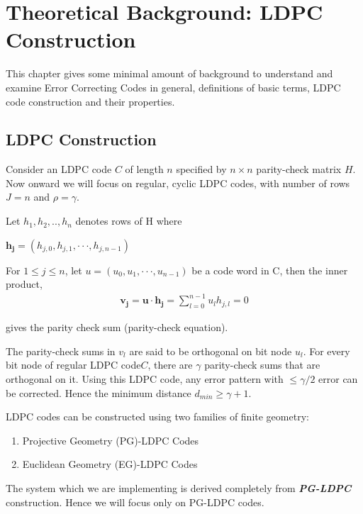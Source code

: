 \chapter{Theoretical Background: LDPC Construction} \label{ldpc_chap}
\label{chapter6}
This chapter gives some minimal amount of background to understand and examine Error Correcting Codes in general, 
definitions of basic terms, LDPC code construction and their properties\cite{shaishav_mtp}.


\section{LDPC Construction} 

Consider an LDPC code \cite{ecc_shu_lin} $C$ of length $n$ specified by $n\times n$ parity-check matrix $H$.
Now onward we will focus on regular, cyclic LDPC codes, with number of rows $J=n$
and $\rho=\gamma$.

Let $h_{1}, h_{2},.., h_{n}$ denotes rows of H where
\begin{center}
 $\mathbf{h_{j}}=(h_{j,0},h_{j,1},\cdot \cdot \cdot,h_{j,n-1} ) $
\end{center}

For $1\leq j \leq n$, let $u= (u_{0}, u_{1},\cdot \cdot \cdot,u_{n-1})$ be a code word in C,
then the inner product,
\begin{align*}
  \mathbf{v_{j}=u \cdot h_{j}}=\sum_{l=0}^{n-1}u_{l} h_{j,l}=0 
\end{align*}


gives the parity check sum (parity-check equation).

The parity-check sums in $v_{l}$ are said to be orthogonal on bit node $u_{l}$.
For every bit node of regular LDPC code$C$, there are $\gamma$ parity-check sums
that are orthogonal on it. Using this LDPC code, any error pattern with $\leq \gamma /2$
error can be corrected.
Hence the minimum distance $d_{min} \geq \gamma +1$.

LDPC codes can be constructed using two families of finite geometry:
\begin{enumerate}
 \item Projective Geometry (PG)-LDPC Codes
 \item Euclidean Geometry (EG)-LDPC Codes
\end{enumerate}

The system which we are implementing is derived completely from \textbf{\textit{PG-LDPC}}
construction. Hence we will focus only on PG-LDPC codes.

